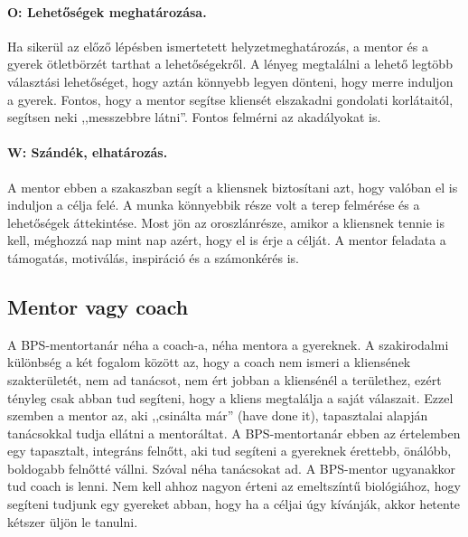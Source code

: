 \paragraph{O: Lehetőségek meghatározása.} Ha sikerül az előző lépésben ismertetett helyzetmeghatározás, a
mentor és a gyerek ötletbörzét tarthat a lehetőségekről. A lényeg
megtalálni a lehető legtöbb választási lehetőséget, hogy aztán könnyebb
legyen dönteni, hogy merre induljon a gyerek. Fontos, hogy a mentor
segítse kliensét elszakadni gondolati korlátaitól, segítsen neki
,,messzebbre látni''. Fontos felmérni az akadályokat is.

\paragraph{W: Szándék, elhatározás.} A mentor ebben a szakaszban segít a kliensnek
biztosítani azt, hogy valóban el is induljon a célja felé. A munka
könnyebbik része volt a terep felmérése és a lehetőségek
áttekintése.
Most jön az oroszlánrésze, amikor a kliensnek tennie is kell, méghozzá
nap mint nap azért, hogy el is érje a célját. A mentor feladata a
támogatás, motiválás, inspiráció és a számonkérés is.

\hypertarget{mentor-vagy-coach}{%
\subsection{Mentor vagy coach}\label{mentor-vagy-coach}}

A BPS-mentortanár néha a coach-a, néha mentora a gyereknek. A szakirodalmi
különbség a két fogalom között az, hogy a coach nem ismeri a kliensének
szakterületét, nem ad tanácsot, nem ért jobban a kliensénél a
területhez, ezért tényleg csak abban tud segíteni, hogy a kliens
megtalálja a saját válaszait. Ezzel szemben a mentor az, aki ,,csinálta
már'' (have done it), tapasztalai alapján tanácsokkal tudja ellátni a
mentoráltat. A BPS-mentortanár ebben az értelemben egy tapasztalt,
integráns felnőtt, aki tud segíteni a gyereknek érettebb, önálóbb,
boldogabb felnőtté vállni. Szóval néha tanácsokat ad. A BPS-mentor
ugyanakkor tud coach is lenni. Nem kell ahhoz nagyon érteni az
emeltszíntű biológiához, hogy segíteni tudjunk egy gyereket abban, hogy
ha a céljai úgy kívánják, akkor hetente kétszer üljön le tanulni.
